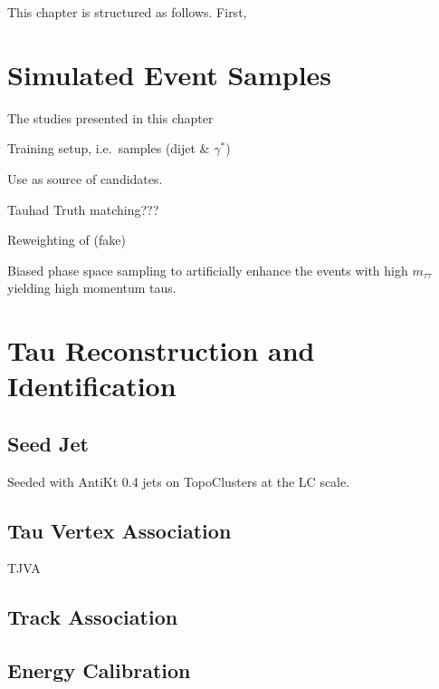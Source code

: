 This chapter is structured as follows. First,









\section{Simulated Event Samples}
\label{sec:tauid_mc}

The studies presented in this chapter

Training setup, i.e.\ samples (dijet \& $\gamma^*$)

Use as source of \tauhadvis candidates.

Tauhad Truth matching???

Reweighting of (fake) \tauhad \pT

Biased phase space sampling to artificially enhance the events with
high $m_{\tau\tau}$ yielding high momentum taus.


\section{Tau Reconstruction and Identification}
\label{sec:tauid_reco_and_id}


\subsection{Seed Jet}

Seeded with AntiKt 0.4 jets on TopoClusters at the LC scale.


\subsection{Tau Vertex Association}

TJVA


\subsection{Track Association}

\cite{duschinger}


\subsection{Energy Calibration}

